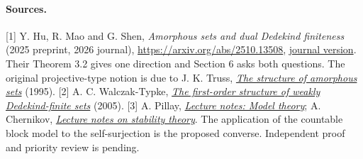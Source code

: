 \documentclass[11pt]{article}
\begin{document}
\paragraph{Sources.} [1] Y. Hu, R. Mao and G. Shen, \emph{Amorphous sets and dual Dedekind finiteness} (2025 preprint, 2026 journal), \url{https://arxiv.org/abs/2510.13508}, \href{https://doi.org/10.1016/j.apal.2026.103723}{journal version}. Their Theorem 3.2 gives one direction and Section 6 asks both questions. The original projective-type notion is due to J. K. Truss, \href{https://www.sciencedirect.com/science/article/pii/016800729400024W}{\emph{The structure of amorphous sets}} (1995).
[2] A. C. Walczak-Typke, \href{https://doi.org/10.2178/jsl/1129642121}{\emph{The first-order structure of weakly Dedekind-finite sets}} (2005).
[3] A. Pillay, \href{https://www3.nd.edu/~apillay/pdf/lecturenotes_modeltheory.pdf}{\emph{Lecture notes: Model theory}}; A. Chernikov, \href{https://www.math.ucla.edu/~chernikov/teaching/StabilityTheory285D/StabilityNotes.pdf}{\emph{Lecture notes on stability theory}}. The application of the countable block model to the self-surjection is the proposed converse. Independent proof and priority review is pending.
\end{document}
